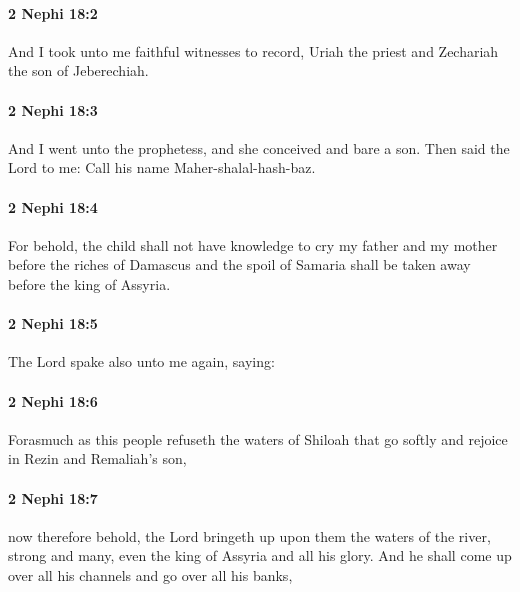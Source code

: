 		\paragraph{2 Nephi 18:2} %
			\label{2NEPHI-18-2}

			And I took unto me faithful witnesses to record,
			Uriah the priest and Zechariah the son of Jeberechiah.

		\paragraph{2 Nephi 18:3} %
			\label{2NEPHI-18-3}

			And I went unto the prophetess,
			and she conceived and bare a son.
			Then said the Lord to me:
			Call his name Maher-shalal-hash-baz.

		\paragraph{2 Nephi 18:4} %
			\label{2NEPHI-18-4}

			For behold, the child shall not have knowledge to cry my father and my mother
			before the riches of Damascus and the spoil of Samaria
			shall be taken away before the king of Assyria.

		\paragraph{2 Nephi 18:5} %
			\label{2NEPHI-18-5}

			The Lord spake also unto me again, saying:

		\paragraph{2 Nephi 18:6} %
			\label{2NEPHI-18-6}

			Forasmuch as this people refuseth the waters of Shiloah that go softly
			and rejoice in Rezin and Remaliah's son,

		\paragraph{2 Nephi 18:7} %
			\label{2NEPHI-18-7}

			now therefore behold, the Lord bringeth up upon them the waters of the river,
			strong and many, even the king of Assyria and all his glory.
			And he shall come up over all his channels and go over all his banks,

